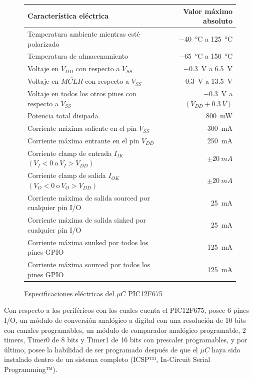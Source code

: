 \begin{figure}[!h]
    \centering
    \begin{tabular}{lr}
          \toprule
          Característica eléctrica& Valor máximo absoluto\\ 
          \midrule
          Temperatura ambiente mientras esté polarizado & \SI{-40}{\degreeCelsius} a \SI{+125}{\degreeCelsius}\\
          Temperatura de almacenamiento & \SI{-65}{\degreeCelsius} a \SI{+150}{\degreeCelsius}\\
          Voltaje en $V_{DD}$ con respecto a $V_{SS}$ & \SI{-0.3}{V} a \SI{+6.5}{V}\\
          Voltaje en $\overline{MCLR}$ con respecto a $V_{SS}$ & \SI{-0.3}{V} a \SI{+13.5}{V}\\
          Voltaje en todos los otros pines con respecto a $V _{SS}$ & \SI{-0.3}{V} a $(V _{DD} + \SI{0.3}{V})$\\
          Potencia total disipada & \SI{800}{mW}\\
          Corriente máxima saliente en el pin $V _{SS}$ & \SI{300}{mA}\\
          Corriente máxima entrante en el pin $V _{DD}$ & \SI{250}{mA}\\
          Corriente clamp de entrada $I _{IK}$ $(V _{I}<0\ \text{o}\ V _{I}>V _{DD})$ & $\pm \SI{20}{mA}$\\
          Corriente clamp de salida $I _{OK}$ $(V _{O}<0\ \text{o}\ V _{O}>V _{DD})$ & $\pm \SI{20}{mA}$\\
          Corriente máxima de salida sourced por cualquier pin I/O & \SI{25}{mA}\\
          Corriente máxima de salida sinked por cualquier pin I/O & \SI{25}{mA}\\
          Corriente máxima sunked por todos los pines GPIO & \SI{125}{mA}\\
          Corriente máxima sourced por todos los pines GPIO & \SI{125}{mA}\\
          \bottomrule
      \end{tabular}
    \caption{Especificaciones eléctricas del $\mu C$ PIC12F675}
    \label{t1}
\end{figure}

Con respecto a los periféricos con los cuales cuenta el PIC12F675, posee 6 pines I/O, un módulo de conversión analógico a digital con una resolución de 10 bits con canales programables, un módulo de comparador analógico programable, 2 timers, Timer0 de 8 bits y Timer1 de 16 bits con prescaler programables, y por último, posee la habilidad de ser programado después de que el $\mu C$ haya sido instalado dentro de un sistema completo (ICSP™, In-Circuit Serial Programming™).

